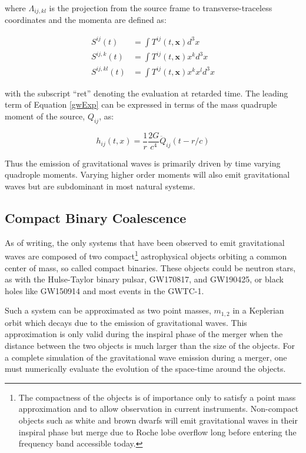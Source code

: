 \documentclass [12pt, proquest]{uwthesis}[2019]
\begin{document}
where $\Lambda_{ij,kl}$ is the projection from the source frame to transverse-traceless coordinates and the momenta are defined as:

\begin{align}
S^{ij}(t)&=\int T^{ij}(t,\mathbf{x}) d^3x\\
S^{ij,k}(t)&=\int T^{ij}(t,\mathbf{x}) x^k d^3x\\
S^{ij,kl}(t)&=\int T^{ij}(t,\mathbf{x}) x^k x^l d^3x
\end{align}

with the subscript ``ret'' denoting the evaluation at retarded time. The leading term of Equation \ref{gwExp} can be expressed in terms of the mass quadruple moment of the source, $Q_{ij}$, as:

\begin{equation}
h_{ij}(t,x)=\frac{1}{r}\frac{2 G}{c^4} \ddot{Q}_{ij}(t-r/c)
\end{equation}

Thus the emission of gravitational waves is primarily driven by time varying quadrople moments. Varying higher order moments will also emit gravitational waves but are subdominant in most natural systems.

\subsection{Compact Binary Coalescence}\label{CBC}

As of writing, the only systems that have been observed to emit gravitational waves are composed of two compact\footnote{The compactness of the objects is of importance only to satisfy a point mass approximation and to allow observation in current instruments. Non-compact objects such as white and brown dwarfs will emit gravitational waves in their inspiral phase but merge due to Roche lobe overflow long before entering the frequency band accessible today.} astrophysical objects orbiting a common center of mass, so called compact binaries. These objects could be neutron stars, as with the Hulse-Taylor binary pulsar\cite{hulseTaylor}, GW170817\cite{GW170817}, and GW190425\cite{GW190425}, or black holes like GW150914\cite{GW150914} and most events in the GWTC-1\cite{GWTC}.

Such a system can be approximated as two point masses, $m_{1,2}$ in a Keplerian orbit which decays due to the emission of gravitational waves. This approximation is only valid during the inspiral phase of the merger when the distance between the two objects is much larger than the size of the objects. For a complete simulation of the gravitational wave emission during a merger, one must numerically evaluate the evolution of the space-time around the objects. \cite{NGR}
\end{document}
